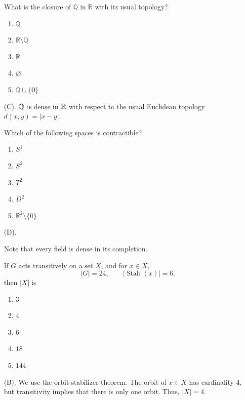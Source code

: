 \begin{exercise}
What is the closure of $\mathbb{Q}$ in $\mathbb{R}$ with its usual topology?

\begin{enumerate}[label=(\Alph*)]
    \item $\mathbb{Q}$
    \item $\mathbb{R}\setminus\mathbb{Q}$
    \item $\mathbb{R}$
    \item $\varnothing$
    \item $\mathbb{Q}\cup\{0\}$
\end{enumerate}
\end{exercise}
\begin{solution}
(C). $\mathbb{Q}$ is dense in $\mathbb{R}$ with respect to the usual Euclidean topology 
$d(x,y) = |x - y|$.
\end{solution}

\begin{exercise}
Which of the following spaces is contractible?
\begin{enumerate}[label=(\Alph*)]
    \item $S^1$
    \item $S^2$
    \item $T^2$
    \item $D^2$
    \item $\mathbb{R}^2\setminus\{0\}$
\end{enumerate}
\end{exercise}
\begin{solution}
(D).
\end{solution}

\begin{remark}
Note that every field is dense in its completion.
\end{remark}

\begin{exercise}
If $G$ acts transitively on a set $X$, and for $x\in X$,
\[
|G|=24,
\qquad
|\operatorname{Stab}(x)|=6,
\]
then $|X|$ is
\begin{enumerate}[label=(\Alph*)]
    \item $3$
    \item $4$
    \item $6$
    \item $18$
    \item $144$
\end{enumerate}
\end{exercise}
\begin{solution}
(B). We use the orbit-stabilizer theorem. The orbit of $x \in X$ has 
cardinality $4$, but transitivity implies that there is only one orbit.
Thus, $|X| = 4$.
\end{solution}

